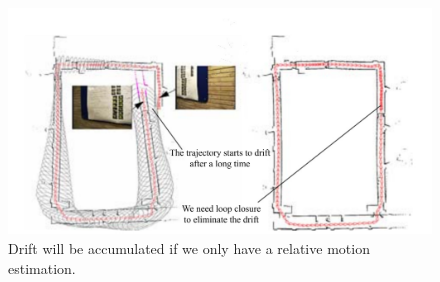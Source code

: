 \begin{figure}
    \centering
    \includegraphics[width=1.0\textwidth]{./resources/whatIsSLAM/loopclosure.pdf}
    \caption{Drift will be accumulated if we only have a relative motion estimation.}
    \label{fig:loopclosure}
\end{figure}

